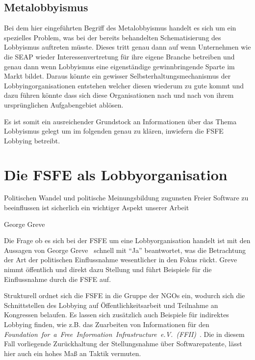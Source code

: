 \subsection{Metalobbyismus}
Bei dem hier eingeführten Begriff des Metalobbyismus handelt es sich um ein 
spezielles Problem, was bei der bereits behandelten Schematisierung des 
Lobbyismus auftreten müsste. Dieses tritt genau dann auf wenn Unternehmen wie 
die SEAP wieder Interessenvertretung für ihre eigene Branche betreiben und 
genau dann wenn Lobbyismus eine eigenständige gewinnbringende Sparte im Markt 
bildet. Daraus könnte ein gewisser Selbsterhaltungsmechanismus der 
Lobbyingorganisationen entstehen welcher diesen wiederum zu gute kommt und dazu 
führen könnte dass sich diese Organisationen nach und nach von ihrem 
ursprünglichen Aufgabengebiet ablösen.

Es ist somit ein ausreichender Grundstock an Informationen über das Thema 
Lobbyismus gelegt um im folgenden genau zu klären, inwiefern die FSFE Lobbying 
betreibt.

\newpage
\section{Die FSFE als Lobbyorganisation}
\epigraph{Politischen Wandel und politische Meinungsbildung zugunsten Freier 
Software zu beeinflussen ist sicherlich ein wichtiger Aspekt unserer 
Arbeit}{George Greve~\cite{PLGreveInterView}}
Die Frage ob es sich bei der FSFE um eine Lobbyorganisation handelt ist mit den 
Aussagen von George Greve~\cite{PLGreveInterView} schnell mit ``Ja'' 
beantwortet, was die Betrachtung der Art der politischen Einflussnahme 
wesentlicher in den Fokus rückt. Greve nimmt öffentlich und direkt 
dazu Stellung und führt Beispiele für die Einflussnahme durch die FSFE auf.

Strukturell ordnet sich die FSFE in die Gruppe der NGOs ein, wodurch sich die 
Schnittstellen des Lobbying auf Öffentlichkeitsarbeit und Teilnahme an 
Kongressen belaufen. Es lassen sich zusätzlich auch Beispiele für indirektes 
Lobbying finden, wie z.B. das Zuarbeiten von Informationen für den 
\emph{Foundation~for~a~Free~Information~Infrastructure~e.V.~(FFII)}~\cite{PLGreveInterView}.
Die in diesem Fall vorliegende Zurückhaltung der Stellungsnahme über 
Softwarepatente, lässt hier auch ein hohes Maß an Taktik vermuten.

